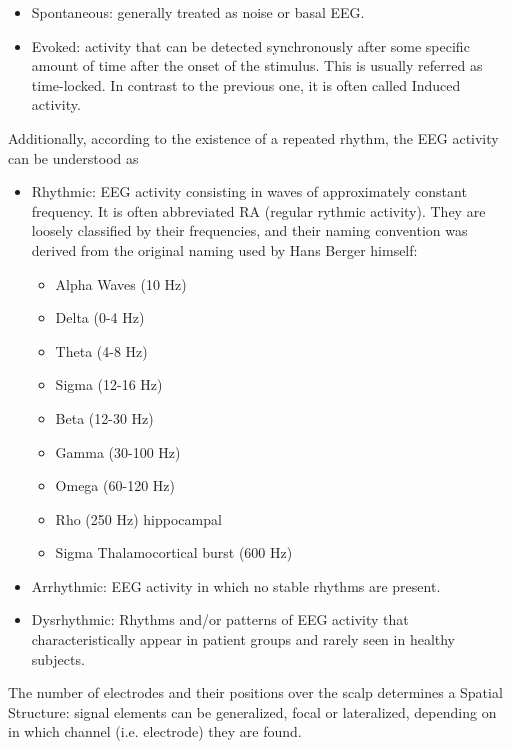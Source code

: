 \begin{itemize}
\item Spontaneous: generally treated as noise or basal EEG.
\item Evoked: activity that can be detected synchronously after some specific amount of time after the onset of the stimulus.  This is usually referred as time-locked.  In contrast to the previous one, it is often called Induced activity.
\end{itemize}

\noindent Additionally, according to the existence of a repeated rhythm, the EEG activity can be understood as

\begin{itemize}
\item Rhythmic: EEG activity consisting in waves of approximately constant frequency.  It is often abbreviated RA (regular rythmic activity). They are loosely classified by their frequencies, and their naming convention was derived from the original naming used by Hans Berger himself:

\begin{itemize}
\item Alpha Waves (10 Hz)
\item Delta (0-4 Hz)
\item Theta (4-8 Hz)
\item Sigma (12-16 Hz)
\item Beta (12-30 Hz)
\item Gamma (30-100 Hz)
\item Omega (60-120 Hz)
\item Rho (250 Hz) hippocampal
\item Sigma Thalamocortical burst (600 Hz)
\end{itemize}

\item Arrhythmic: EEG activity in which no stable rhythms are present.  
\item Dysrhythmic: Rhythms and/or patterns of EEG activity that characteristically appear in patient groups and rarely seen in healthy subjects.
\end{itemize}

The number of electrodes and their positions over the scalp determines a Spatial Structure: signal elements can be generalized, focal or lateralized, depending on in which channel (i.e. electrode) they are found.




